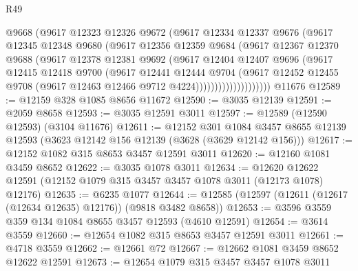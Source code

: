 \begin{lexlean}{R49}
\begin{coremodule}
                      @9668
                      (@9617
                        @12323
                        @12326
                        @9672
                        (@9617
                          @12334
                          @12337
                          @9676
                          (@9617
                            @12345
                            @12348
                            @9680
                            (@9617
                              @12356
                              @12359
                              @9684
                              (@9617
                                @12367
                                @12370
                                @9688
                                (@9617
                                  @12378
                                  @12381
                                  @9692
                                  (@9617
                                    @12404
                                    @12407
                                    @9696
                                    (@9617
                                      @12415
                                      @12418
                                      @9700
                                      (@9617
                                        @12441
                                        @12444
                                        @9704
                                        (@9617
                                          @12452
                                          @12455
                                          @9708
                                          (@9617 @12463 @12466 @9712 @4224))))))))))))))))))))
    @11676
@12589 := @12159 @328 @1085 @8656 @11672
@12590 := @3035 @12139
@12591 := @2059 @8658
@12593 := @3035 @12591 @3011
@12597 := @12589 (@12590 @12593) (@3104 @11676)
@12611 := @12152
    @301
    @1084
    @3457
    @8655
    @12139
    @12593
    (@3623 @12142 @156 @12139 (@3628 (@3629 @12142 @156)))
@12617 := @12152 @1082 @315 @8653 @3457 @12591 @3011
@12620 := @12160 @1081 @3459 @8652
@12622 := @3035 @1078 @3011
@12634 := @12620 @12622 @12591 (@12152 @1079 @315 @3457 @3457 @1078 @3011 (@12173 @1078) @12176)
@12635 := @6235 @1077
@12644 := @12585 (@12597 (@12611 (@12617 (@12634 @12635) @12176)) (@9818 @3482 @8658))
@12653 := @3596 @3559 @359 @134 @1084 @8655 @3457 @12593 (@4610 @12591)
@12654 := @3614 @3559
@12660 := @12654 @1082 @315 @8653 @3457 @12591 @3011
@12661 := @4718 @3559
@12662 := @12661 @72
@12667 := @12662 @1081 @3459 @8652 @12622 @12591
@12673 := @12654 @1079 @315 @3457 @3457 @1078 @3011

\end{coremodule}
\end{lexlean}
